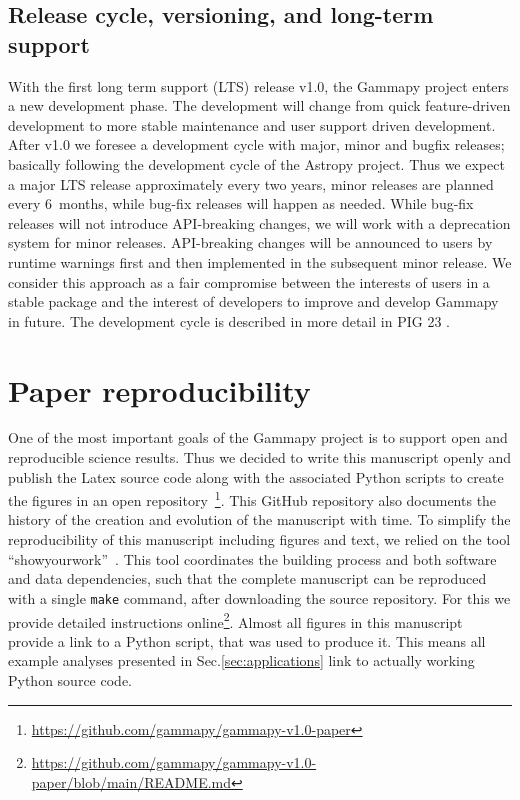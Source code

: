 \documentclass[longauth]{aa}
\newcommand{\code}[1]{\texttt{#1}}
\newcommand{\gammapy}{Gammapy\xspace}
\newcommand{\github}{GitHub\xspace}
\begin{document}
\subsection{Release cycle, versioning, and long-term support}
\label{ssec:release-cycle}
With the first long term support (LTS) release v1.0, the \gammapy project
enters a new development phase. The development will change from
quick feature-driven development to more stable maintenance
and user support driven development. After v1.0 we foresee
a development cycle with major, minor and bugfix releases;
basically following the development cycle of the Astropy
project. Thus we expect a major LTS release approximately
every two years, minor releases are planned every 6~months,
while bug-fix releases will happen as needed. While
bug-fix releases will not introduce API-breaking changes,
we will work with a deprecation system for minor releases.
API-breaking changes will be announced to users by runtime
warnings first and then implemented in the subsequent
minor release. We consider this approach as a fair
compromise between the interests of users in a stable
package and the interest of developers to improve
and develop \gammapy in future. The development cycle is described
in more detail in PIG 23 \citep{gammapy_pig_23}.

\section{Paper reproducibility}
\label{sec:reproducibility}
One of the most important goals of the \gammapy project is to support open and
reproducible science results. Thus we decided to write this manuscript
openly and publish the Latex source code along with the associated
Python scripts to create the figures
in an open repository~\footnote{\url{https://github.com/gammapy/gammapy-v1.0-paper}}.
This \github repository also documents the history of the creation
and evolution of the manuscript with time. To simplify the reproducibility
of this manuscript including figures and text, we relied on the tool
\enquote{showyourwork}~\citep{Luger2021}. This tool coordinates the building
process and both software and data dependencies, such that the complete
manuscript can be reproduced with a single \code{make} command, after
downloading the source repository. For this we provide
detailed instructions online\footnote{\url{https://github.com/gammapy/gammapy-v1.0-paper/blob/main/README.md}}.
Almost all figures in this manuscript provide a link
to a Python script, that was used to produce it. This means all
example analyses presented in Sec.\ref{sec:applications} link to
actually working Python source code.
\end{document}
